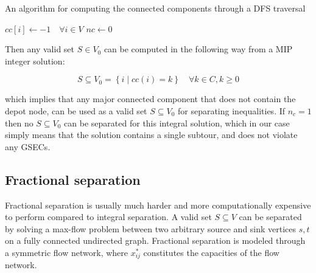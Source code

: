 \begin{algorithm}
	\caption{An algorithm for computing the connected components through a DFS traversal}
	\label{src:cc-dfs}
	$cc[i] \gets -1 \quad \forall i \in V$\;
	$nc \gets 0$\;

	\;
	\;
	\;
	\;
\end{algorithm}
Then any valid set $S \in V_0$ can be computed in the following way from a MIP integer solution:

\begin{equation}
	S \subseteq V_0 = \left\{ i \mid cc(i) = k  \right\}   \quad \forall k \in C, k \ge 0
\end{equation}

which implies that any major connected component that does not contain the depot node, can be used as a valid set $S \subseteq V_0$ for separating inequalities.
If $n_c = 1$ then no $S \subseteq V_0$ can be separated for this integral solution, which in our case simply means that the solution contains a single subtour, and does not violate any GSECs.


\subsection{Fractional separation}
Fractional separation is usually much harder and more computationally expensive to perform compared to integral separation.
A valid set $S \subseteq V$ can be separated by solving a max-flow problem between two arbitrary source and sink vertices $s, t$ on a fully connected undirected graph.
Fractional separation is modeled through a symmetric flow network, where $x^*_{ij}$ constitutes the capacities of the flow network.

